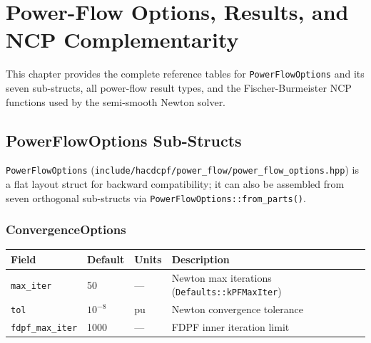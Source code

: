 \section{Power-Flow Options, Results, and NCP Complementarity}
\label{sec:pf-options-results}

This chapter provides the complete reference tables for
\texttt{PowerFlowOptions} and its seven sub-structs,
all power-flow result types, and the Fischer-Burmeister NCP
functions used by the semi-smooth Newton solver.

\subsection{PowerFlowOptions Sub-Structs}
\label{sec:pf-options-sub}

\texttt{PowerFlowOptions} (\texttt{include/hacdcpf/power\_flow/power\_flow\_options.hpp})
is a flat layout struct for backward compatibility; it can also be assembled
from seven orthogonal sub-structs via \texttt{PowerFlowOptions::from\_parts()}.

\subsubsection{ConvergenceOptions}
\begin{center}
\begin{tabular}{llll}
\hline\hline
\textbf{Field} & \textbf{Default} & \textbf{Units} & \textbf{Description} \\
\hline
\texttt{max\_iter} & 50 & --- & Newton max iterations (\texttt{Defaults::kPFMaxIter}) \\
\texttt{tol} & \(10^{-8}\) & pu & Newton convergence tolerance \\
\texttt{fdpf\_max\_iter} & 1000 & --- & FDPF inner iteration limit \\
\hline\hline
\end{tabular}
\end{center}

